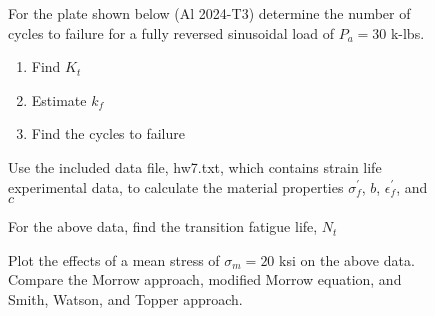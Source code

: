 \documentclass[12pt, oneside]{article}
\begin{document}
\begin{enumerate}

\begin{figure}[H]
	\item For the plate shown below (Al 2024-T3) determine the number of cycles to failure for a fully reversed sinusoidal load of $P_a = 30$ k-lbs.
	\begin{enumerate}
		\item Find $K_t$
		\item Estimate $k_f$
		\item Find the cycles to failure
	\end{enumerate}
	\centering
	\label{fig:problem3}
\end{figure}

\begin{figure}[H]
	\item Use the included data file, hw7.txt, which contains strain life experimental data, to calculate the material properties $\sigma_f^\prime$, $b$, $\epsilon_f^\prime$, and $c$
\end{figure}

\begin{figure}[H]
	\item For the above data, find the transition fatigue life, $N_t$
\end{figure}

\begin{figure}[H]
	\item Plot the effects of a mean stress of $\sigma_m = 20$ ksi on the above data. Compare the Morrow approach, modified Morrow equation, and Smith, Watson, and Topper approach.
\end{figure}

\end{enumerate}
\end{document}
